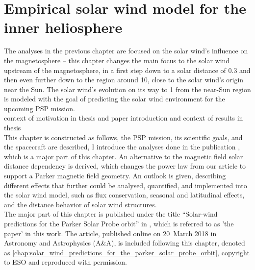 
\chapter{Empirical solar wind model for the inner heliosphere}
\label{chap:empirical_solar_wind_model_for_the_inner_heliosphere}


The analyses in the previous chapter are focused on the solar wind's influence on the magnetosphere -- this chapter changes the main focus to the solar wind upstream of the magnetosphere, in a first step down to a solar distance of \SI{0.3}{\au} and then even further down to the region around \SI{10}{\Rs}, close to the solar wind's origin near the Sun. The solar wind's evolution on its way to \SI{1}{\au} from the near-Sun region is modeled with the goal of predicting the solar wind environment for the upcoming PSP mission.\\

context of motivation in thesis and paper introduction and context of results in thesis\\

This chapter is constructed as follows, the PSP mission, its scientific goals, and the spacecraft are described, I introduce the analyses done in the publication \citet{Venzmer2018}, which is a major part of this chapter. An alternative to the magnetic field solar distance dependency is derived, which changes the power law from our article to support a Parker magnetic field geometry. An outlook is given, describing different effects that further could be analysed, quantified, and implemented into the solar wind model, such as flux conservation, seasonal and latitudinal effects, and the distance behavior of solar wind structures.\\


The major part of this chapter is published under the title ``Solar-wind predictions for the Parker Solar Probe orbit'' in \citet{Venzmer2018}, which is referred to as 'the paper' in this work. The article, published online on 20~March 2018 in Astronomy and Astrophysics (A\&A), is included following this chapter, denoted as \autoref{chap:solar_wind_predictions_for_the_parker_solar_probe_orbit}, copyright to ESO and reproduced with permission.

